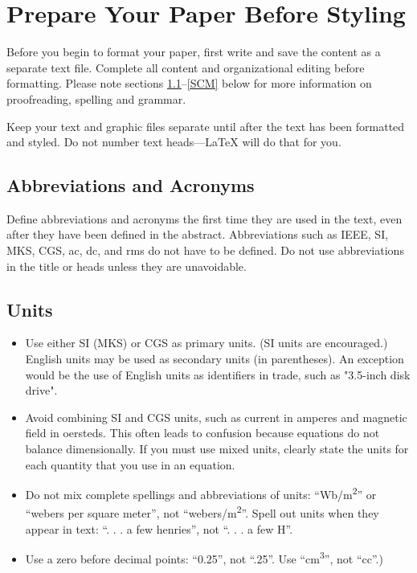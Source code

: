 \documentclass[conference]{IEEEtran}
\begin{document}

\section{Prepare Your Paper Before Styling}

Before you begin to format your paper, first write and save the content as a 
separate text file. Complete all content and organizational editing before 
formatting. Please note sections \ref{AA}--\ref{SCM} below for more information on 
proofreading, spelling and grammar.

Keep your text and graphic files separate until after the text has been 
formatted and styled. Do not number text heads---{\LaTeX} will do that 
for you.

    \subsection{Abbreviations and Acronyms}\label{AA}

    Define abbreviations and acronyms the first time they are used in the text, 
    even after they have been defined in the abstract. Abbreviations such as 
    IEEE, SI, MKS, CGS, ac, dc, and rms do not have to be defined. Do not use 
    abbreviations in the title or heads unless they are unavoidable.


    \subsection{Units}

    \begin{itemize}
        \item {Use either SI (MKS) or CGS as primary units. (SI units are encouraged.) 
               English units may be used as secondary units (in parentheses). An exception 
               would be the use of English units as identifiers in trade, such as 
               "3.5-inch disk drive".}
        \item {Avoid combining SI and CGS units, such as current in amperes and magnetic 
               field in oersteds. This often leads to confusion because equations do not 
               balance dimensionally. If you must use mixed units, clearly state the units 
               for each quantity that you use in an equation.}
        \item {Do not mix complete spellings and abbreviations of units: 
               ``Wb/m\textsuperscript{2}'' or ``webers per square meter'', not 
               ``webers/m\textsuperscript{2}''. Spell out units when they appear in text: 
               ``. . . a few henries'', not ``. . . a few H''.}
        \item {Use a zero before decimal points: ``0.25'', not ``.25''. Use 
               ``cm\textsuperscript{3}'', not ``cc''.)}
    \end{itemize}
\end{document}
